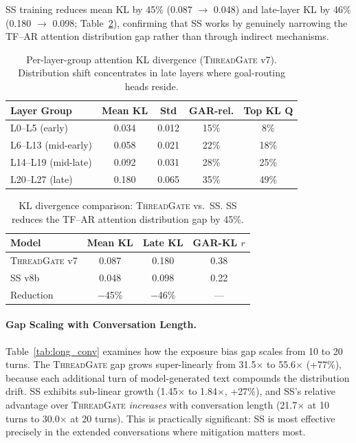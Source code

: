 \documentclass[11pt]{article}
\newcommand{\gar}{\textsc{GAR}}
\newcommand{\tg}{\textsc{ThreadGate}}
\begin{document}
SS training reduces mean KL by 45\% (0.087 $\to$ 0.048) and late-layer KL by 46\% (0.180 $\to$ 0.098; Table~\ref{tab:kl_model}), confirming that SS works by genuinely narrowing the TF--AR attention distribution gap rather than through indirect mechanisms.

\begin{table}[t]
\centering
\small
\caption{Per-layer-group attention KL divergence (\tg{} v7). Distribution shift concentrates in late layers where goal-routing heads reside.}
\label{tab:kl_layers}
\begin{tabular}{lcccc}
\toprule
\textbf{Layer Group} & \textbf{Mean KL} & \textbf{Std} & \textbf{\gar{}-rel.} & \textbf{Top KL Q} \\
\midrule
L0--L5 (early) & 0.034 & 0.012 & 15\% & 8\% \\
L6--L13 (mid-early) & 0.058 & 0.021 & 22\% & 18\% \\
L14--L19 (mid-late) & 0.092 & 0.031 & 28\% & 25\% \\
L20--L27 (late) & 0.180 & 0.065 & 35\% & 49\% \\
\bottomrule
\end{tabular}
\end{table}

\begin{table}[t]
\centering
\small
\caption{KL divergence comparison: \tg{} vs.\ SS. SS reduces the TF--AR attention distribution gap by 45\%.}
\label{tab:kl_model}
\begin{tabular}{lccc}
\toprule
\textbf{Model} & \textbf{Mean KL} & \textbf{Late KL} & \textbf{\gar{}-KL $r$} \\
\midrule
\tg{} v7 & 0.087 & 0.180 & 0.38 \\
SS v8b & 0.048 & 0.098 & 0.22 \\
Reduction & $-$45\% & $-$46\% & --- \\
\bottomrule
\end{tabular}
\end{table}

\paragraph{Gap Scaling with Conversation Length.} Table~\ref{tab:long_conv} examines how the exposure bias gap scales from 10 to 20 turns. The \tg{} gap grows super-linearly from 31.5$\times$ to 55.6$\times$ (+77\%), because each additional turn of model-generated text compounds the distribution drift. SS exhibits sub-linear growth (1.45$\times$ to 1.84$\times$, +27\%), and SS's relative advantage over \tg{} \emph{increases} with conversation length (21.7$\times$ at 10 turns to 30.0$\times$ at 20 turns). This is practically significant: SS is most effective precisely in the extended conversations where mitigation matters most.
\end{document}
